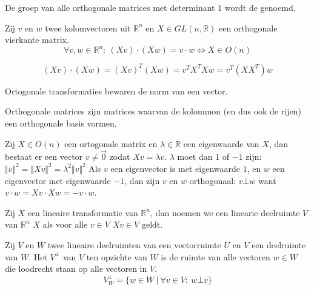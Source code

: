 \documentclass[main.tex]{subfiles}
\begin{document}
\begin{de}
  De groep van alle orthogonale matrices met determinant $1$ wordt de  genoemd.
\end{de}

\begin{st}
  Zij $v$ en $w$ twee kolomvectoren uit $\mathbb{R}^{n}$ en $X \in GL(n,\mathbb{R})$ een orthogonale vierkante matrix.
  \[ \forall v,w \in \mathbb{R}^{n}:\ (Xv)\cdot(Xw) = v \cdot w \Leftrightarrow X \in O(n) \]

\[ (Xv) \cdot (Xw) = (Xv)^{T}(Xw) = v^{T}X^{T}Xw = v^{T}(XX^{T})w \]
\end{st}

\begin{st}
  Ortogonale transformaties bewaren de norm van een vector.
\end{st}

\begin{st}
  Orthogonale matrices zijn matrices waarvan de kolommon (en dus ook de rijen) een orthogonale basis vormen.
\end{st}

\begin{st}
  Zij $X\in O(n)$ een ortogonale matrix en $\lambda\in \mathbb{R}$ een eigenwaarde van $X$, dan bestaat er een vector $v\neq \vec{0}$ zodat $Xv = \lambda v$.
  $\lambda$ moet dan $1$ of $-1$ zijn: $ \Vert v \Vert^{2} = \Vert X v \Vert^{2} = \lambda^{2}\Vert v\Vert^{2}$
  Als $v$ een eigenvector is met eigenwaarde $1$, en $w$ een eigenvector met eigenwaarde $-1$, dan zijn $v$ en $w$ orthogonaal: $v \bot w$
  want $v \cdot w = Xv \cdot Xw = -v \cdot w$.
\end{st}

\begin{de}
  Zij $X$ een lineaire transformatie van $\mathbb{R}^{n}$, dan noemen we een linearie deelruimte $V$ van $\mathbb{R}^{n}$  $X$ als voor alle $v\in V$ $Xv \in V$ geldt.
\end{de}

\begin{de}
  Zij $V$ en $W$ twee lineaire deelruimten van een vectorruimte $U$ en $V$ een deelruimte van $W$.
  Het  $V^{\bot}$ van $V$ ten opzichte van $W$ is de ruimte van alle vectoren $w\in W$ die loodrecht staan op alle vectoren in $V$.
  \[ V^{\bot}_{W} = \{ w \in W\ |\ \forall v \in V:\ w \bot v \} \]
\end{de}
\end{document}
